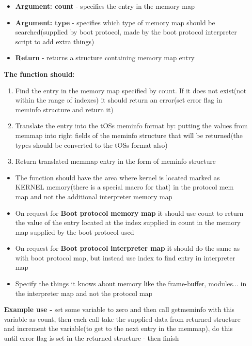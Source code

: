 \documentclass{report}
\begin{document}
\begin{flushleft}
\begin{itemize}
	\item \textbf{Argument: count} - specifies the entry in the memory map
	\item \textbf{Argument: type} - specifies which type of memory map should be searched(supplied by boot protocol, made by the boot protocol interpreter script to add extra things)
	\item \textbf{Return} - returns a structure containing memory map entry
\end{itemize}

\textbf{The function should:}
\begin{enumerate}
	\item Find the entry in the memory map specified by count. If it does not exist(not within the range of indexes) it should return an error(set error flag in meminfo structure and return it)
	\item Translate the entry into the tOSs meminfo format by: putting the values from memmap into right fields of the meminfo structure that will be returned(the types should be converted  to the tOSs format also)
	\item Return translated memmap entry in the form of meminfo structure
\end{enumerate}	
\begin{itemize}
	\item The function should have the area where kernel is located marked as KERNEL memory(there is a special macro for that) in the protocol mem map and not the additional interpreter memory map
	\item On request for \textbf{Boot protocol memory map} it should use count to return the value of the entry located at the index supplied in count in the memory map supplied by the boot protocol used
	\item On request for \textbf{Boot protocol interpreter map} it should do the same as with boot protocol map, but instead use index to find entry in interpreter map
	\item Specify the things it knows about memory like the frame-buffer, modules... in the interpreter map and not the protocol map
\end{itemize}
\textbf{Example use -} set some variable to zero and then call getmeminfo with this variable as count, then each call take the supplied data from returned structure and increment the variable(to get to the next entry in the memmap), do this until error flag is set in the returned structure - then finish
\end{flushleft}
\end{document}
